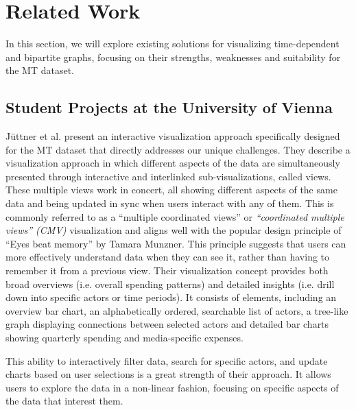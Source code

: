 \documentclass{vgtc}                          %
\begin{document}
\section{Related Work} %


In this section, we will explore existing solutions for visualizing time-dependent and bipartite graphs, focusing on their strengths, weaknesses and suitability for the MT dataset.

\subsection{Student Projects at the University of Vienna}

Jüttner et al. \cite{Jttner2017MediaTI} present an interactive visualization approach specifically designed for the MT dataset that directly addresses our unique challenges.
They describe a visualization approach in which different aspects of the data are simultaneously presented through interactive and interlinked sub-visualizations, called views. These multiple views work in concert, all showing different aspects of the same data and being updated in sync when users interact with any of them. This is commonly referred to as a ``multiple coordinated views'' or \textit{``coordinated multiple views'' (CMV)} \cite{roberts2007state} visualization and aligns well with the popular design principle of ``Eyes beat memory'' by Tamara Munzner. This principle suggests that users can more effectively understand data when they can see it, rather than having to remember it from a previous view. Their visualization concept provides both broad overviews (i.e. overall spending patterns) and detailed insights (i.e. drill down into specific actors or time periods). It consists of elements, including an overview bar chart, an alphabetically ordered, searchable list of actors, a tree-like graph displaying connections between selected actors and detailed bar charts showing quarterly spending and media-specific expenses.

This ability to interactively filter data, search for specific actors, and update charts based on user selections is a great strength of their approach. It allows users to explore the data in a non-linear fashion, focusing on specific aspects of the data that interest them.
\end{document}
